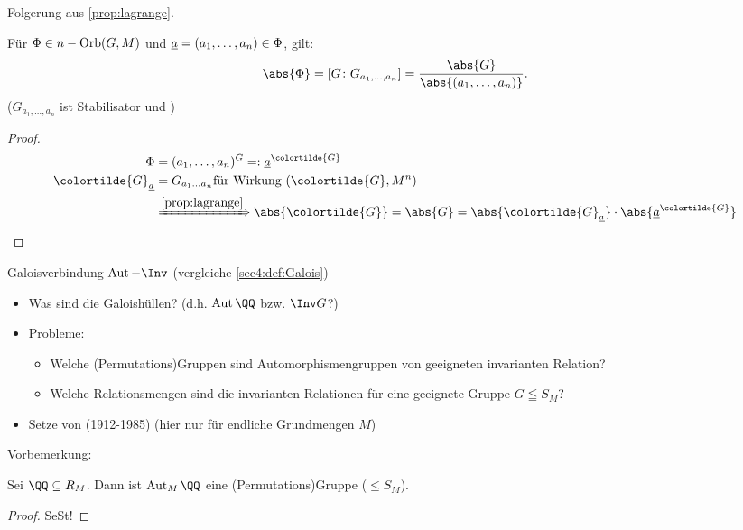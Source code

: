 Folgerung aus \cref{prop:lagrange}.
\begin{lemma}
	Für $\Phi \in n-\operatorname{Orb}(G,M)$ und $\underline{a} = (a_1, \dots, a_n) \in \Phi$, gilt:
	\begin{align*}
		\abs{\Phi} = [G\colon G_{a_1, \dots,a_n}] = \frac{\abs{G}}{\abs{(a_1,\dots,a_n)}}.
	\end{align*}
	($G_{a_1, \dots,a_n}$ ist Stabilisator und )
\end{lemma}
\begin{proof}
	\begin{align*}
		\Phi &= (a_1, \dots, a_n)^G =: \ul{a}^{\colortilde{G}}\\
		\colortilde{G}_{\ul{a}} &= G_{a_1\dots a_n} \text{für Wirkung } (\colortilde{G},M^n)\\
		&\xRightarrow{\cref{prop:lagrange}} \abs{\colortilde{G}} = \abs{G} = \abs{\colortilde{G}_{\ul{a}}}\cdot \abs{\ul{a}^{\colortilde{G}}} 
	\end{align*}
\end{proof}
Galoisverbindung $\Aut-\Inv$ (vergleiche \cref{sec4:def:Galois})\\
\begin{itemize}
	\item Was sind die Galoishüllen? (d.h. $\Aut \QQ$ bzw. $\Inv G$?)
	\item Probleme:
	\begin{itemize}
		\item Welche (Permutations)Gruppen sind Automorphismengruppen von geeigneten invarianten Relation?
		\item Welche Relationsmengen sind die invarianten Relationen für eine geeignete Gruppe $G \leqq S_M$?
	\end{itemize}
	\item Setze von  (1912-1985) (hier nur für endliche Grundmengen $M$)
\end{itemize}
Vorbemerkung:
\begin{proposition}
	\label{sec4:prop:Q_permu}
	Sei $\QQ \subseteq R_M$. Dann ist $\Aut_M \QQ$ eine (Permutations)Gruppe ($\le S_M$).
\end{proposition}
\begin{proof}
	SeSt!
\end{proof}

